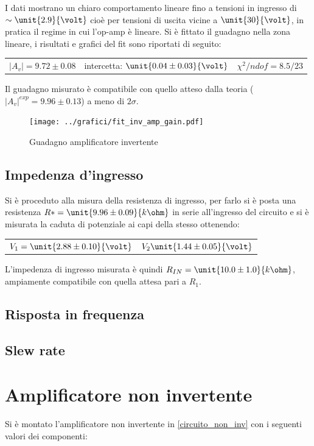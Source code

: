 \documentclass[10pt,a4paper]{article}
\begin{document}
I dati mostrano un chiaro comportamento lineare fino a tensioni in ingresso di $\sim \unit{2.9}{\volt}$ cioè per tensioni di uscita vicine a $\unit{30}{\volt}$, in pratica il regime in cui l'op-amp è lineare. Si è fittato il guadagno nella zona lineare, i risultati e grafici del fit sono riportati di seguito:

\begin{table}[h!]
	\centering
	\begin{tabular}{ccc}
		$|A_v| = 9.72 \pm 0.08$  & intercetta: $\unit{0.04 \pm 0.03}{\volt}$ & $\chi^2/ndof= 8.5 / 23$
	\end{tabular}
\end{table}
Il guadagno misurato è compatibile con quello atteso dalla teoria ($|A_v|^{exp} = 9.96 \pm 0.13$) a meno di $2\sigma$.
\begin{figure}[h!]
	\centering
	\texttt{[image: ../grafici/fit\_inv\_amp\_gain.pdf]}
	\caption{Guadagno amplificatore invertente}
	\label{fig:inv_amp_gain}
\end{figure}
 
\subsection{Impedenza d'ingresso}
Si è proceduto alla misura della resistenza di ingresso, per farlo si è posta una resistenza $R* = \unit{9.96 \pm 0.09}{k\ohm}$ in serie all'ingresso del circuito e si è misurata la caduta di potenziale ai capi della stesso ottenendo:

\begin{table}[h!]
	\centering
	\begin{tabular}{cc}
		$V_1 = \unit{2.88 \pm 0.10}{\volt}$  &  $V_2\unit{1.44 \pm 0.05}{\volt}$
	\end{tabular}
\end{table}

L'impedenza di ingresso misurata è quindi $R_{IN}=\unit{10.0 \pm 1.0}{k\ohm}$, ampiamente compatibile con quella attesa pari a $R_1$.

\subsection{Risposta in frequenza}

\subsection{Slew rate}

\section{Amplificatore non invertente}
Si è montato l'amplificatore non invertente in \figurename{\ref{circuito_non_inv}} con i seguenti valori dei componenti:
\end{document}
